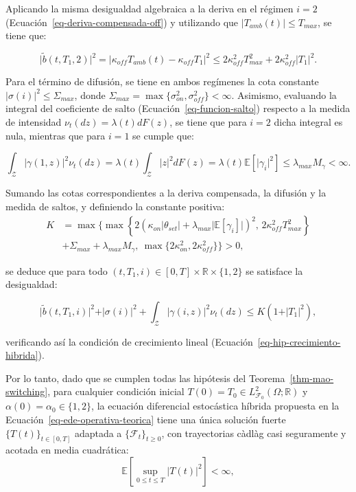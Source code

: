 \documentclass[
  spanish,
  us-letterpaper,
]{scrreprt}
\numberwithin{equation}{section}
\theoremstyle{plain}
\theoremstyle{plain}
\theoremstyle{definition}
\theoremstyle{plain}
\theoremstyle{remark}
\begin{document}
Aplicando la misma desigualdad algebraica a la deriva en el régimen
\(i = 2\) (Ecuación~\ref{eq-deriva-compensada-off}) y utilizando que
\(\vert T_{amb}(t) \vert \le T_{max}\), se tiene que:

\[
\vert \tilde{b}(t, T_1, 2) \vert^2 = \vert \kappa_{off}T_{amb}(t) - \kappa_{off}T_1 \vert^2 \le 2\kappa_{off}^2 T_{max}^2 + 2\kappa_{off}^2 \vert T_1 \vert^2.
\]

Para el término de difusión, se tiene en ambos regímenes la cota
constante \(\vert \sigma(i) \vert^2 \le \Sigma_{max}\), donde
\(\Sigma_{max} = \max\{\sigma_{on}^2, \sigma_{off}^2\} < \infty\).
Asimismo, evaluando la integral del coeficiente de salto
(Ecuación~\ref{eq-funcion-salto}) respecto a la medida de intensidad
\(\nu_t(dz) = \lambda(t)dF(z)\), se tiene que para \(i = 2\) dicha
integral es nula, mientras que para \(i = 1\) se cumple que:

\[
\int_{\mathcal{Z}} \vert \gamma(1, z) \vert^2 \nu_t(dz) = \lambda(t) \int_{\mathcal{Z}} \vert z \vert^2 dF(z) = \lambda(t) \mathbb{E}[\vert \gamma_i \vert^2] \le \lambda_{max} M_\gamma < \infty.
\]

Sumando las cotas correspondientes a la deriva compensada, la difusión y
la medida de saltos, y definiendo la constante positiva: \[
\begin{aligned}
K &= \max \Bigg\{ \max\left\{ 2\left( \kappa_{on}\vert \theta_{set} \vert + \lambda_{max}\vert \mathbb{E}[\gamma_i] \vert \right)^2, \, 2\kappa_{off}^2 T_{max}^2 \right\} \\
&+ \Sigma_{max} + \lambda_{max} M_\gamma, \ \max\{2\kappa_{on}^2, 2\kappa_{off}^2\} \Bigg\} > 0,
\end{aligned}
\]

se deduce que para todo
\((t, T_1, i) \in [0, T] \times \mathbb{R} \times \{1, 2\}\) se
satisface la desigualdad:

\[
\vert \tilde{b}(t, T_1, i) \vert^2 + \vert \sigma(i) \vert^2 + \int_{\mathcal{Z}} \vert \gamma(i, z) \vert^2 \nu_t(dz) \le K\left( 1 + \vert T_1 \vert^2 \right),
\]

verificando así la condición de crecimiento lineal
(Ecuación~\ref{eq-hip-crecimiento-hibrida}).

Por lo tanto, dado que se cumplen todas las hipótesis del
Teorema~\ref{thm-mao-switching}, para cualquier condición inicial
\(T(0) = T_0 \in L^2_{\mathcal{F}_0}(\Omega; \mathbb{R})\) y
\(\alpha(0) = \alpha_0 \in \{1, 2\}\), la ecuación diferencial
estocástica híbrida propuesta en la
Ecuación~\ref{eq-ede-operativa-teorica} tiene una única solución fuerte
\(\{T(t)\}_{t \in [0, T]}\) adaptada a \(\{\mathcal{F}_t\}_{t \ge 0}\),
con trayectorias càdlàg casi seguramente y acotada en media cuadrática:
\[
\mathbb{E}\left[ \sup_{0 \le t \le T} \vert T(t) \vert^2 \right] < \infty,
\]
\end{document}
